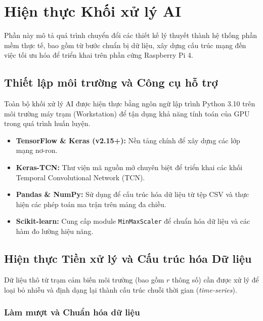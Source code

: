 \section{Hiện thực Khối xử lý AI}

Phần này mô tả quá trình chuyển đổi các thiết kế lý thuyết thành hệ thống phần mềm thực tế, bao gồm từ bước chuẩn bị dữ liệu, xây dựng cấu trúc mạng đến việc tối ưu hóa để triển khai trên phần cứng Raspberry Pi 4.

\subsection{Thiết lập môi trường và Công cụ hỗ trợ}

Toàn bộ khối xử lý AI được hiện thực bằng ngôn ngữ lập trình Python 3.10 trên môi trường máy trạm (Workstation) để tận dụng khả năng tính toán của GPU trong quá trình huấn luyện.

\begin{itemize}
    \item \textbf{TensorFlow \& Keras (v2.15+):} Nền tảng chính để xây dựng các lớp mạng nơ-ron.
    
    \item \textbf{Keras-TCN:} Thư viện mã nguồn mở chuyên biệt để triển khai các khối Temporal Convolutional Network (TCN).
    
    \item \textbf{Pandas \& NumPy:} Sử dụng để cấu trúc hóa dữ liệu từ tệp CSV và thực hiện các phép toán ma trận trên mảng đa chiều.
    
    \item \textbf{Scikit-learn:} Cung cấp module \texttt{MinMaxScaler} để chuẩn hóa dữ liệu và các hàm đo lường hiệu năng.
\end{itemize}

\subsection{Hiện thực Tiền xử lý và Cấu trúc hóa Dữ liệu}

Dữ liệu thô từ trạm cảm biến môi trường (bao gồm $r$ thông số) cần được xử lý để loại bỏ nhiễu và định dạng lại thành cấu trúc chuỗi thời gian (\textit{time-series}).

\subsubsection{Làm mượt và Chuẩn hóa dữ liệu}

